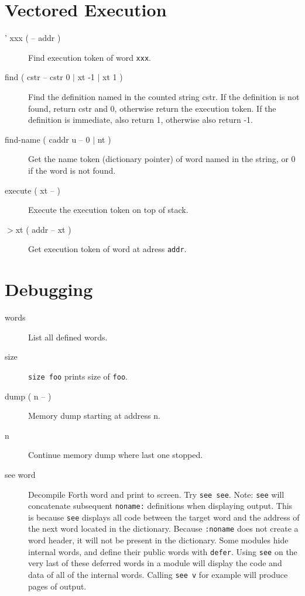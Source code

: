 \section{Vectored Execution}

\begin{description}
\item[' xxx ( -- addr )] Find execution token of word \texttt{xxx}.
\item[find ( cstr -- cstr 0 $\vert$ xt -1 $\vert$ xt 1 )] Find the definition named in the counted string cstr. If the definition is not found, return cstr and 0, otherwise return the execution token. If the definition is immediate, also return 1, otherwise also return -1.
\item[find-name ( caddr u -- 0 $\vert$ nt )] Get the name token (dictionary pointer) of word named in the string, or 0 if the word is not found.
\item[execute ( xt -- )] Execute the execution token on top of stack.
\item[$>$xt ( addr -- xt )] Get execution token of word at adress \texttt{addr}.

\end{description}

\section{Debugging}

\begin{description}
\item[words] List all defined words.
\item[size] \texttt{size foo} prints size of \texttt{foo}.
\item[dump ( n -- )] Memory dump starting at address n.
\item[n] Continue memory dump where last one stopped.
\item[see word] Decompile Forth word and print to screen. Try \texttt{see see}.
	Note: \texttt{see} will concatenate subsequent \texttt{noname:} definitions when displaying output. This is because \texttt{see} displays all code between the target word and the address of the next word located in the dictionary. Because \texttt{:noname} does not create a word header, it will not be present in the dictionary.
		Some modules hide internal words, and define their public words with \texttt{defer}. Using \texttt{see} on the very last of these deferred words in a module will display the code and data of all of the internal words. Calling \texttt{see v} for example will produce pages of output.
\end{description}

